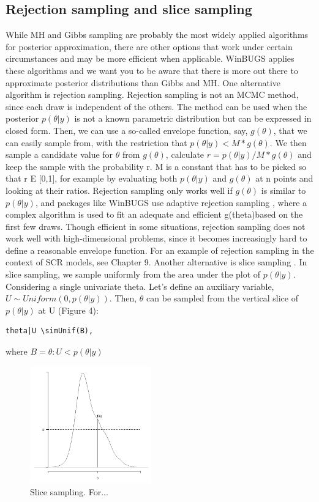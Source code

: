 \subsection{Rejection sampling and slice sampling }
While MH and Gibbs sampling are probably the most widely applied algorithms for posterior approximation, there are other options that work under certain circumstances and may be more efficient when applicable. WinBUGS applies these algorithms and we want you to be aware that there is more out there to approximate posterior distributions than Gibbs and MH. 
One alternative algorithm is rejection sampling. Rejection sampling is not an MCMC method, since each draw is independent of the others. The method can be used when the posterior $p(\theta|y)$ is not a known parametric distribution but can be expressed in closed form. Then, we can use a so-called envelope function, say, $g(\theta)$, that we can easily sample from, with the restriction that $p(\theta|y) < M * g(\theta)$. We then sample a candidate value for $\theta$ from $g(\theta)$, calculate $r = p(\theta|y)/M*g(\theta)$ and keep the sample with the probability r. M is a constant that has to be picked so that r E [0,1], for example by evaluating both $p(\theta|y)$ and $g(\theta)$ at n points and looking at their ratios. Rejection sampling only works well if $g(\theta)$ is similar to $p(\theta|y)$, and packages like WinBUGS use adaptive rejection sampling \citep{gilks_wild:1992}, where a complex algorithm is used to fit an adequate and efficient g(theta)based on the first few draws. Though efficient in some situations, rejection sampling does not work well with high-dimensional problems, since it becomes increasingly hard to define a reasonable envelope function. For an example of rejection sampling in the context of SCR models, see Chapter 9. 
Another alternative is slice sampling \citep{neal:2003}. In slice sampling, we sample uniformly from the area under the plot of $p(\theta|y)$. Considering a single univariate theta. Let's define an auxiliary variable, $U \sim  Uniform(0, p(\theta|y))$. Then, $\theta$ can be sampled from the vertical slice of $p(\theta|y)$ at U (Figure 4):
\begin{verbatim}
theta|U \simUnif(B),
\end{verbatim}
where $B = {\theta: U < p(\theta|y)}$


\begin{figure}
\begin{center}
\includegraphics[height=2in]{figs/slicesampling}
\end{center}
\caption{Slice sampling. For...} 
\label{slicesample.fig}
\end{figure}

